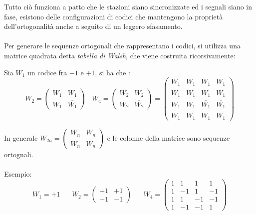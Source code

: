 \documentclass[12pt, letterpaper]{article}
\newcommand{\acc}{\\\hphantom{}\\}
\begin{document}
Tutto ciò funziona a patto che le stazioni siano sincronizzate ed i segnali siano in fase, esistono delle 
configurazioni di codici che mantengono la proprietà dell'ortogonalità anche a seguito di un leggero sfasamento.\acc 
Per generare le sequenze ortogonali che rappresentano i codici, si utilizza una matrice quadrata detta 
\textit{tabella di Walsh}, che viene costruita ricorsivamente:\begin{center}
    Sia $W_1$ un codice fra $-1$ e $+1$, si ha che : 
    $$ W_2=\begin{pmatrix}
        W_1&W_1\\ W_1&\overline{W_1}
    \end{pmatrix}\;\;\; W_4=\begin{pmatrix}
        W_2&W_2\\ W_2&\overline{W_2}\end{pmatrix}=\begin{pmatrix}
            W_1& W_1& W_1& W_1\\ 
            W_1&\overline{ W_1}& W_1&\overline{ W_1}\\ 
            W_1& W_1&\overline{W_1}&\overline{W_1}\\
            W_1&\overline{ W_1} &\overline{ W_1}&W_1
        \end{pmatrix}
    $$
\end{center}
    In generale $W_{2n} = \begin{pmatrix}
        W_n&W_n\\ W_n&\overline{W_n}
    \end{pmatrix}$ e le colonne della matrice sono sequenze ortognali.\acc  Esempio:
    $$ W_1 = +1 \;\;\;\;\;\;W_2=\begin{pmatrix}
        +1&+1\\ +1&-1
    \end{pmatrix}\;\;\;\;\;\;W_4=
    \begin{pmatrix}
        1& 1& 1& 1\\ 
        1&-1& 1&-1\\ 
        1& 1&-1&-1\\
        1&-1 &-1&1
    \end{pmatrix}$$
\end{document}
